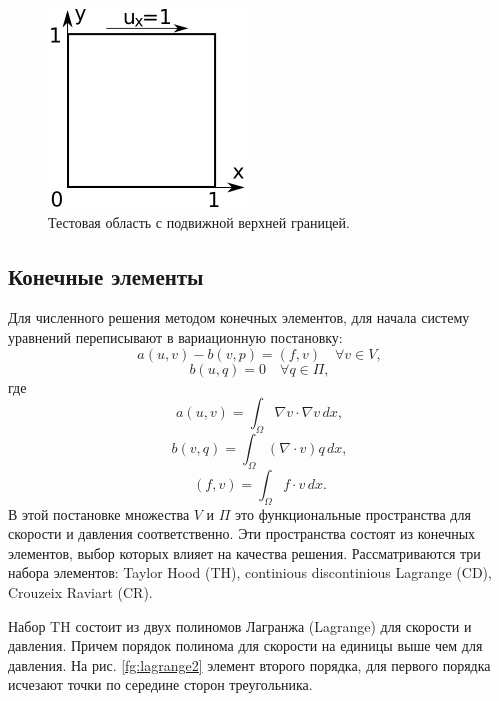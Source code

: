 \documentclass[12pt]{article}
\begin{document}
\begin{figure}
	\begin{center}
		\includegraphics[width=200px]{pics/cavity400}
		\caption{Тестовая область с подвижной верхней границей.}
		\label{fg:cavity}
	\end{center}
\end{figure}

\subsection{Конечные элементы}
Для численного решения методом конечных элементов, для начала систему уравнений переписывают в вариационную постановку:
\begin{equation}
a(u,v)-b(v,p)=(f,v) \quad \forall v \in V,
\end{equation}
\begin{equation}
b(u,q)=0 \quad \forall q \in \Pi,
\end{equation}
где 
\begin{equation}
a(u,v)=\int_\Omega \nabla v \cdot \nabla v \, dx,
\end{equation}
\begin{equation}
b(v,q)=\int_\Omega (\nabla \cdot v) q \, dx,
\end{equation}
\begin{equation}
(f,v)=\int_\Omega f \cdot v \, dx.
\end{equation}
В этой постановке множества $V$ и $\Pi$ это функциональные пространства для скорости и давления соответственно. Эти пространства состоят из конечных элементов, выбор которых влияет на качества решения. Рассматриваются три набора элементов: Taylor Hood (TH), continious discontinious Lagrange (CD), Crouzeix Raviart (CR). 

Набор TH состоит из двух полиномов Лагранжа (Lagrange) для скорости и давления. Причем порядок полинома для скорости на единицы выше чем для давления. На рис. \ref{fg:lagrange2} элемент второго порядка, для первого порядка исчезают точки по середине сторон треугольника.
\end{document}
